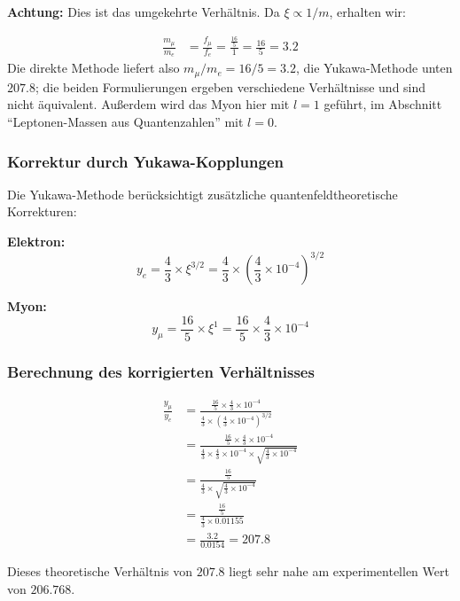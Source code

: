 \textbf{Achtung:} Dies ist das umgekehrte Verhältnis. Da $\xi \propto 1/m$, erhalten wir:

\begin{align}
	\frac{m_\mu}{m_e} &= \frac{f_\mu}{f_e} = \frac{\frac{16}{5}}{1} = \frac{16}{5} = 3.2
\end{align}
Die direkte Methode liefert also $m_\mu/m_e = 16/5 = 3.2$, die Yukawa-Methode unten $207.8$; die beiden Formulierungen ergeben verschiedene Verhältnisse und sind nicht äquivalent. Außerdem wird das Myon hier mit $l = 1$ geführt, im Abschnitt \enquote{Leptonen-Massen aus Quantenzahlen} mit $l = 0$.

\subsubsection{Korrektur durch Yukawa-Kopplungen}

Die Yukawa-Methode berücksichtigt zusätzliche quantenfeldtheoretische Korrekturen:

\textbf{Elektron:}
\begin{equation}
	y_e = \frac{4}{3} \times \xi^{3/2} = \frac{4}{3} \times \left(\frac{4}{3} \times 10^{-4}\right)^{3/2}
\end{equation}

\textbf{Myon:}
\begin{equation}
	y_\mu = \frac{16}{5} \times \xi^1 = \frac{16}{5} \times \frac{4}{3} \times 10^{-4}
\end{equation}

\subsubsection{Berechnung des korrigierten Verhältnisses}

\begin{align}
	\frac{y_\mu}{y_e} &= \frac{\frac{16}{5} \times \frac{4}{3} \times 10^{-4}}{\frac{4}{3} \times \left(\frac{4}{3} \times 10^{-4}\right)^{3/2}}\\
	&= \frac{\frac{16}{5} \times \frac{4}{3} \times 10^{-4}}{\frac{4}{3} \times \frac{4}{3} \times 10^{-4} \times \sqrt{\frac{4}{3} \times 10^{-4}}}\\
	&= \frac{\frac{16}{5}}{\frac{4}{3} \times \sqrt{\frac{4}{3} \times 10^{-4}}}\\
	&= \frac{\frac{16}{5}}{\frac{4}{3} \times 0.01155}\\
	&= \frac{3.2}{0.0154} = 207.8
\end{align}

Dieses theoretische Verhältnis von $207.8$ liegt sehr nahe am experimentellen Wert von $206.768$.

